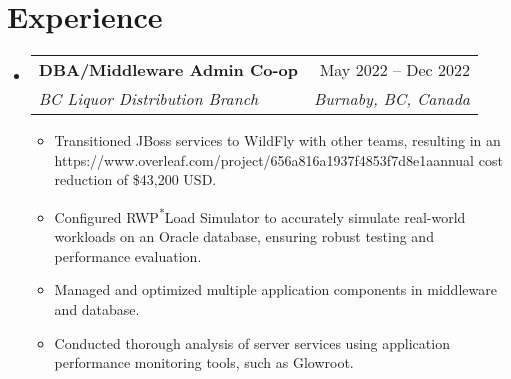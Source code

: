 \documentclass[letterpaper,11pt]{article}
\makeatletter
\newcommand{\resumeItem}[1]{
  \item\small{
    {#1 \vspace{-2pt}}
  }
}
\newcommand{\resumeSubheading}[4]{
  \vspace{-2pt}\item
    \begin{tabular*}{0.97\textwidth}[t]{l@{\extracolsep{\fill}}r}
      \textbf{#1} & #2 \\
      \textit{\small#3} & \textit{\small #4} \\
    \end{tabular*}\vspace{-7pt}
}
\newcommand{\resumeSubSubheading}[2]{
    \item
    \begin{tabular*}{0.97\textwidth}{l@{\extracolsep{\fill}}r}
      \textit{\small#1} & \textit{\small #2} \\
    \end{tabular*}\vspace{-7pt}
}
\newcommand{\resumeSubHeadingListStart}{\begin{itemize}[leftmargin=0.15in, label={}]}
\newcommand{\resumeSubHeadingListEnd}{\end{itemize}}
\newcommand{\resumeItemListStart}{\begin{itemize}}
\newcommand{\resumeItemListEnd}{\end{itemize}\vspace{-5pt}}
\makeatother
\begin{document}
\section{Experience}
  \resumeSubHeadingListStart
    \resumeSubheading
      {DBA/Middleware Admin Co-op}{May 2022 -- Dec 2022}
      {BC Liquor Distribution Branch}{Burnaby, BC, Canada}
      \resumeItemListStart
        \resumeItem{Transitioned JBoss services to WildFly with other teams, resulting in an https://www.overleaf.com/project/656a816a1937f4853f7d8e1aannual cost reduction of \$43,200 USD.}
        \resumeItem{Configured RWP\textsuperscript{*}Load Simulator to accurately simulate real-world workloads on an Oracle database, ensuring robust testing and performance evaluation.}
        \resumeItem{Managed and optimized multiple application components in middleware and database.}
        \resumeItem{Conducted thorough analysis of server services using application performance monitoring tools, such as Glowroot.}
      \resumeItemListEnd
  \resumeSubHeadingListEnd
      


\end{document}
